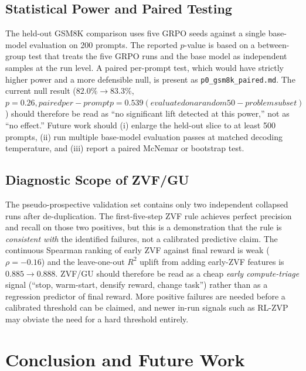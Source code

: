 \documentclass[12pt,a4paper]{report}
\begin{document}
\section*{Statistical Power and Paired Testing}
The held-out GSM8K comparison uses five GRPO seeds against a single base-model evaluation on 200 prompts. The reported $p$-value is based on a between-group test that treats the five GRPO runs and the base model as independent samples at the run level. A paired per-prompt test, which would have strictly higher power and a more defensible null, is present as \texttt{p0\_gsm8k\_paired.md}. The current null result ($82.0\%\to83.3\%$, $p=0.26, paired per-prompt p=0.539 (evaluated on a random 50-problem subset)$) should therefore be read as ``no significant lift detected at this power,'' not as ``no effect.'' Future work should (i) enlarge the held-out slice to at least 500 prompts, (ii) run multiple base-model evaluation passes at matched decoding temperature, and (iii) report a paired McNemar or bootstrap test.

\section*{Diagnostic Scope of ZVF/GU}
The pseudo-prospective validation set contains only two independent collapsed runs after de-duplication. The first-five-step ZVF rule achieves perfect precision and recall on those two positives, but this is a demonstration that the rule is \emph{consistent with} the identified failures, not a calibrated predictive claim. The continuous Spearman ranking of early ZVF against final reward is weak ($\rho=-0.16$) and the leave-one-out $R^2$ uplift from adding early-ZVF features is $0.885\!\to\!0.888$. ZVF/GU should therefore be read as a cheap \emph{early compute-triage} signal (``stop, warm-start, densify reward, change task'') rather than as a regression predictor of final reward. More positive failures are needed before a calibrated threshold can be claimed, and newer in-run signals such as RL-ZVP~\citep{liu2025rlzvp} may obviate the need for a hard threshold entirely.

\chapter{Conclusion and Future Work}
\label{ch:conclusion}
\end{document}
